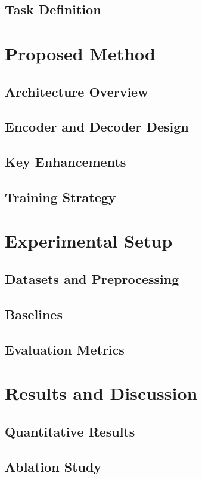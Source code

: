 \documentclass[sigconf]{acmart}
\begin{document}
\subsection{Task Definition}

\section{Proposed Method}
\label{sec:method}
\subsection{Architecture Overview}
\subsection{Encoder and Decoder Design}
\subsection{Key Enhancements}
\subsection{Training Strategy}

\section{Experimental Setup}
\label{sec:experiments}
\subsection{Datasets and Preprocessing}
\subsection{Baselines}
\subsection{Evaluation Metrics}

\section{Results and Discussion}
\subsection{Quantitative Results}
\subsection{Ablation Study}
\end{document}
